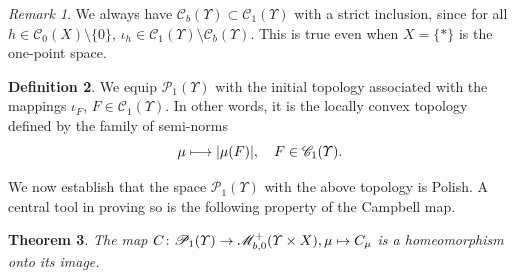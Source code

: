 \documentclass[10pt]{amsart}
\newcommand\mto{\mathchoice{\longmapsto}{\mapsto}{\mapsto}{\mapsto}}
\newtheorem{theorem}{Theorem}[section]
\theoremstyle{definition}
\newtheorem{definition}[theorem]{Definition}
\theoremstyle{remark}
\newtheorem{remark}[theorem]{Remark}
\DeclarePairedDelimiter{\abs}{\lvert}{\rvert}
\begin{document}
\begin{remark}
We always have $\mathscr{C}_{b}(\varUpsilon) \subset \mathscr{C}_{1}(\varUpsilon)$ with a strict inclusion, since for all $h \in \mathscr{C}_{0}(X) \setminus \{0\}$, $\iota_{h} \in \mathscr{C}_{1}(\varUpsilon) \setminus \mathscr{C}_{b}(\varUpsilon)$.
This is true even when $X = \{*\}$ is the one-point space.
\end{remark}

\begin{definition}\label{d:P1}
We equip $\mathscr{P}_{1}(\varUpsilon)$ with the initial topology associated with the mappings $\iota_{F}$, $F \in \mathscr{C}_{1}(\varUpsilon)$.
In other words, it is the locally convex topology defined by the family of semi-norms
\begin{equation*}
\mu \mto \abs{\mu(F)}, \quad F \in \mathscr{C}_{1}(\varUpsilon).
\end{equation*}
\end{definition}

We now establish that the space $\mathscr{P}_{1}(\varUpsilon)$ with the above topology is Polish.
A central tool in proving so is the following property of the Campbell map.

\begin{theorem}\label{t:C-homeomorphism}
The map $C \colon \mathscr{P}_{1}(\varUpsilon) \to \mathscr{M}^{+}_{b,0}(\varUpsilon \times X), \mu \mto C_{\mu}$ is a homeomorphism onto its image.
\end{theorem}
\end{document}
